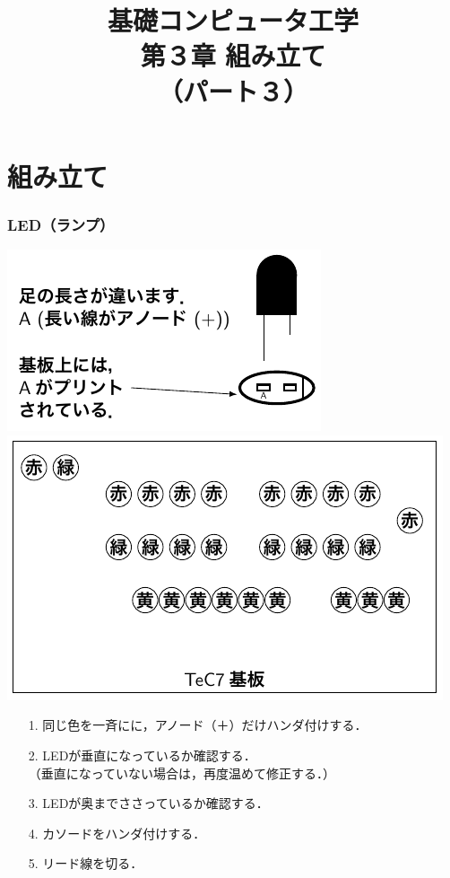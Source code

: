 \documentclass{beamer}                 %
\begin{document}
\title{基礎コンピュータ工学\\第３章 組み立て\\（パート３）}
\date{}

\begin{frame}
  \titlepage
\end{frame}


\section{組み立て}
\begin{frame}
  \frametitle{LED（ランプ）}
  \vfill
  \centerline{\includegraphics[scale=0.65]{../Tikz/leds.pdf}\hspace{2cm}
    \includegraphics[scale=0.65]{../Tikz/leds2.pdf}}
  \vfill
  \begin{enumerate}
    \item[1.] 同じ色を一斉にに，アノード（＋）だけハンダ付けする．
    \item[2.] LEDが垂直になっているか確認する．\\
      （垂直になっていない場合は，再度温めて修正する．）
    \item[3.] LEDが奥までささっているか確認する．
    \item[4.] カソードをハンダ付けする．
    \item[5.] リード線を切る．
  \end{enumerate}
  \vfill
\end{frame}
\end{document}

